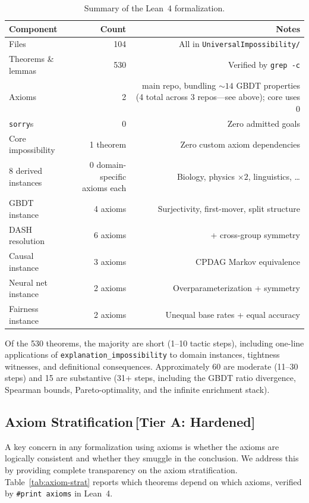 \documentclass[11pt,a4paper]{article}
\begin{document}
\begin{table}[ht]
\centering
\caption{Summary of the Lean~4 formalization.}
\label{tab:lean-summary}
\begin{tabular}{lrr}
\toprule
Component & Count & Notes \\
\midrule
Files & 104 & All in \texttt{UniversalImpossibility/} \\
Theorems \& lemmas & 530 & Verified by \texttt{grep -c} \\
Axioms & 2 & main repo, bundling ${\sim}14$ GBDT properties (4 total across 3 repos---see above); core uses 0 \\
\texttt{sorry}s & 0 & Zero admitted goals \\
\midrule
Core impossibility & 1 theorem & Zero custom axiom dependencies \\
8 derived instances & 0 domain-specific axioms each & Biology, physics $\times 2$, linguistics, \ldots \\
GBDT instance & 4 axioms & Surjectivity, first-mover, split structure \\
DASH resolution & 6 axioms & + cross-group symmetry \\
Causal instance & 3 axioms & CPDAG Markov equivalence \\
Neural net instance & 2 axioms & Overparameterization + symmetry \\
Fairness instance & 2 axioms & Unequal base rates + equal accuracy \\
\bottomrule
\end{tabular}
\end{table}

Of the 530 theorems, the majority are short (1--10 tactic steps), including one-line applications of \texttt{explanation\_impossibility} to domain instances, tightness witnesses, and definitional consequences. Approximately 60 are moderate (11--30 steps) and 15 are substantive (31+ steps, including the GBDT ratio divergence, Spearman bounds, Pareto-optimality, and the infinite enrichment stack).

\subsection{Axiom Stratification\,\textnormal{\normalsize[Tier A: Hardened]}}
\label{sec:axiom-stratification}

A key concern in any formalization using axioms is whether the axioms are
logically consistent and whether they smuggle in the conclusion.  We address
this by providing complete transparency on the axiom stratification.
Table~\ref{tab:axiom-strat} reports which theorems depend on which axioms,
verified by \texttt{\#print axioms} in Lean~4.
\end{document}
